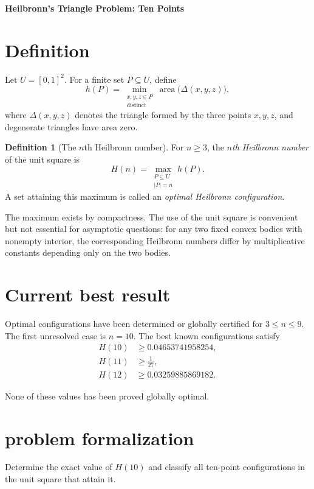 \documentclass[11pt,a4paper]{article}
\theoremstyle{definition}
\newtheorem{definition}{Definition}
\newcommand{\Area}{\operatorname{area}}
\begin{document}
\begin{center}
  {\Large\bfseries Heilbronn's Triangle Problem: Ten Points}
\end{center}
\section{Definition}
Let $U=[0,1]^2$. For a finite set $P\subseteq U$, define
\begin{equation}\label{eq:delta}
 h(P)
 =\min_{\substack{x,y,z\in P\\\text{distinct}}}
   \Area\bigl(\Delta(x,y,z)\bigr),
\end{equation}
where $\Delta(x,y,z)$ denotes the triangle formed by the three points $x,y,z$,
and degenerate triangles have area zero.

\begin{definition}[The $n$th Heilbronn number]
For $n\geq 3$, the \emph{$n$th Heilbronn number} of the unit square is
\begin{equation}\label{eq:H}
 H(n)=\max_{\substack{P\subseteq U\\|P|=n}} h(P).
\end{equation}
A set attaining this maximum is called an \emph{optimal Heilbronn
configuration}.
\end{definition}

The maximum exists by compactness. The use of the unit square is convenient but
not essential for asymptotic questions: for any two fixed convex bodies with
nonempty interior, the corresponding Heilbronn numbers differ by multiplicative
constants depending only on the two bodies.


\section{Current best result}
Optimal configurations have been determined or globally certified for
$3\leq n\leq 9$. The first unresolved case is $n=10$. 
The best known configurations satisfy
\begin{align*}
    H(10)&\geq 0.04653741958254,\\
H(11)&\geq \frac{1}{27},\\
H(12)&\geq 0.03259885869182.
\end{align*}

None of these values has been proved globally optimal.

\section{problem formalization}
Determine the exact value of $H(10)$ and classify all ten-point configurations
in the unit square that attain it.
\end{document}
